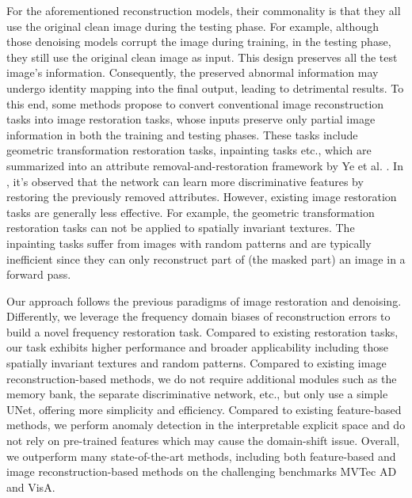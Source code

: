 \documentclass[5p, twocolumn]{elsarticle}[draft]
\begin{document}
For the aforementioned reconstruction models, their commonality is that they all use the original clean image during the testing phase. For example, although those denoising models corrupt the image during training, in the testing phase, they still use the original clean image as input. This design preserves all the test image's information. Consequently, the preserved abnormal information may undergo identity mapping into the final output, leading to detrimental results. To this end, some methods propose to convert conventional image reconstruction tasks into image restoration tasks, whose inputs preserve only partial image information in both the training and testing phases. These tasks include geometric transformation restoration tasks\cite{golan2018deep,hendrycks2019using,huang2019inverse}, inpainting tasks \cite{haselmann2018anomaly,zavrtanik2021reconstruction,pirnay2022inpainting} etc., which are summarized into an attribute removal-and-restoration framework by Ye et al. \cite{ye2020attribute}. In \cite{ye2020attribute}, it's observed that the network can learn more discriminative features by restoring the previously removed attributes. However, existing image restoration tasks are generally less effective. For example, the geometric transformation restoration tasks can not be applied to spatially invariant textures. The inpainting tasks suffer from images with random patterns and are typically inefficient since they can only reconstruct part of (the masked part) an image in a forward pass.  

Our approach follows the previous paradigms of image restoration and denoising. Differently, we leverage the frequency domain biases of reconstruction errors to build a novel frequency restoration task. Compared to existing restoration tasks, our task exhibits higher performance and broader applicability including those spatially invariant textures and random patterns. Compared to existing image reconstruction-based methods, we do not require additional modules such as the memory bank, the separate discriminative network, etc., but only use a simple UNet, offering more simplicity and efficiency. Compared to existing feature-based methods, we perform anomaly detection in the interpretable explicit space and do not rely on pre-trained features which may cause the domain-shift issue. Overall, we outperform many state-of-the-art methods, including both feature-based and image reconstruction-based methods on the challenging benchmarks MVTec AD and VisA.  
\end{document}
